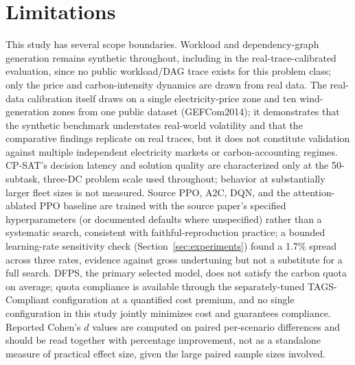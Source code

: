 \documentclass[journal]{IEEEtran}
\begin{document}
\section{Limitations}
\label{sec:limitations}
This study has several scope boundaries. Workload and dependency-graph generation remains synthetic throughout, including in the real-trace-calibrated evaluation, since no public workload/DAG trace exists for this problem class; only the price and carbon-intensity dynamics are drawn from real data. The real-data calibration itself draws on a single electricity-price zone and ten wind-generation zones from one public dataset (GEFCom2014); it demonstrates that the synthetic benchmark understates real-world volatility and that the comparative findings replicate on real traces, but it does not constitute validation against multiple independent electricity markets or carbon-accounting regimes. CP-SAT's decision latency and solution quality are characterized only at the 50-subtask, three-DC problem scale used throughout; behavior at substantially larger fleet sizes is not measured. Source PPO, A2C, DQN, and the attention-ablated PPO baseline are trained with the source paper's specified hyperparameters (or documented defaults where unspecified) rather than a systematic search, consistent with faithful-reproduction practice; a bounded learning-rate sensitivity check (Section~\ref{sec:experiments}) found a 1.7\% spread across three rates, evidence against gross undertuning but not a substitute for a full search. DFPS, the primary selected model, does not satisfy the carbon quota on average; quota compliance is available through the separately-tuned TAGS-Compliant configuration at a quantified cost premium, and no single configuration in this study jointly minimizes cost and guarantees compliance. Reported Cohen's $d$ values are computed on paired per-scenario differences and should be read together with percentage improvement, not as a standalone measure of practical effect size, given the large paired sample sizes involved.
\end{document}
